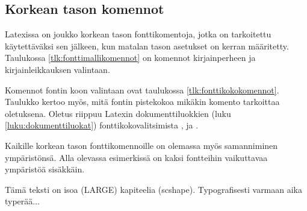 \subsection{Korkean tason komennot}
\label{luku:fontit_korkea}

Latexissa on joukko korkean tason fontti\-komentoja, jotka on
tarkoitettu käytettäväksi sen jälkeen, kun matalan tason asetukset on
kerran määritetty. Taulukossa \ref{tlk:fonttimallikomennot} on komennot
kirjainperheen ja kirjainleikkauksen valintaan.

Komennot fontin koon valintaan ovat taulukossa
\ref{tlk:fonttikokokomennot}. Taulukko kertoo myös, mitä fontin
pistekokoa mikäkin komento tarkoittaa oletuksena. Oletus riippuu Latexin
dokumenttiluokkien (luku \ref{luku:dokumenttiluokat})
fonttikokovalitsimista \koodi{10pt}, \koodi{11pt} ja \koodi{12pt}.

Kaikille korkean tason fonttikomennoille on olemassa myös samanniminen
ympäristönsä. Alla olevassa esimerkissä on kaksi fontteihin vaikuttavaa
ympäristöä sisäkkäin.

\begin{koodilohkosis}
  \begin{LARGE}
    \begin{scshape}
      Tämä teksti on isoa (LARGE) kapiteelia (scshape).
      Typografisesti varmaan aika typerää...
    \end{scshape}
  \end{LARGE}
\end{koodilohkosis}



